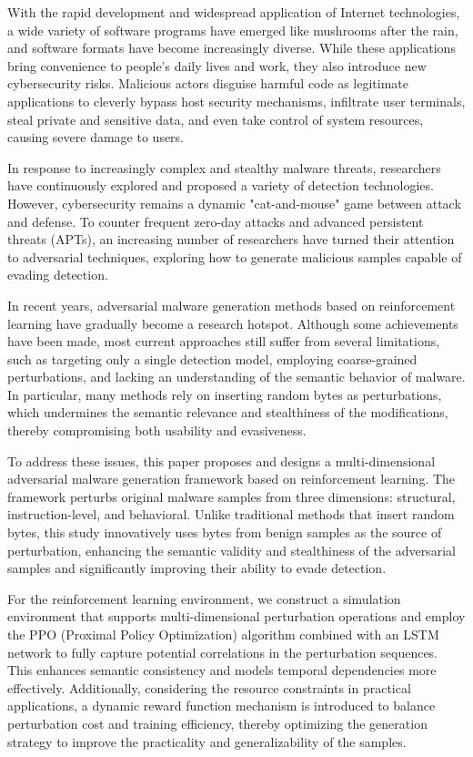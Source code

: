 \begin{abstractEn}
  
  With the rapid development and widespread application of Internet technologies, a wide variety of software programs have emerged like mushrooms after the rain, and software formats have become increasingly diverse. While these applications bring convenience to people’s daily lives and work, they also introduce new cybersecurity risks. Malicious actors disguise harmful code as legitimate applications to cleverly bypass host security mechanisms, infiltrate user terminals, steal private and sensitive data, and even take control of system resources, causing severe damage to users.

  In response to increasingly complex and stealthy malware threats, researchers have continuously explored and proposed a variety of detection technologies. However, cybersecurity remains a dynamic "cat-and-mouse" game between attack and defense. To counter frequent zero-day attacks and advanced persistent threats (APTs), an increasing number of researchers have turned their attention to adversarial techniques, exploring how to generate malicious samples capable of evading detection.
  
  In recent years, adversarial malware generation methods based on reinforcement learning have gradually become a research hotspot. Although some achievements have been made, most current approaches still suffer from several limitations, such as targeting only a single detection model, employing coarse-grained perturbations, and lacking an understanding of the semantic behavior of malware. In particular, many methods rely on inserting random bytes as perturbations, which undermines the semantic relevance and stealthiness of the modifications, thereby compromising both usability and evasiveness.
  
  To address these issues, this paper proposes and designs a multi-dimensional adversarial malware generation framework based on reinforcement learning. The framework perturbs original malware samples from three dimensions: structural, instruction-level, and behavioral. Unlike traditional methods that insert random bytes, this study innovatively uses bytes from benign samples as the source of perturbation, enhancing the semantic validity and stealthiness of the adversarial samples and significantly improving their ability to evade detection.
  
  For the reinforcement learning environment, we construct a simulation environment that supports multi-dimensional perturbation operations and employ the PPO (Proximal Policy Optimization) algorithm combined with an LSTM network to fully capture potential correlations in the perturbation sequences. This enhances semantic consistency and models temporal dependencies more effectively. Additionally, considering the resource constraints in practical applications, a dynamic reward function mechanism is introduced to balance perturbation cost and training efficiency, thereby optimizing the generation strategy to improve the practicality and generalizability of the samples.
  

\end{abstractEn}
